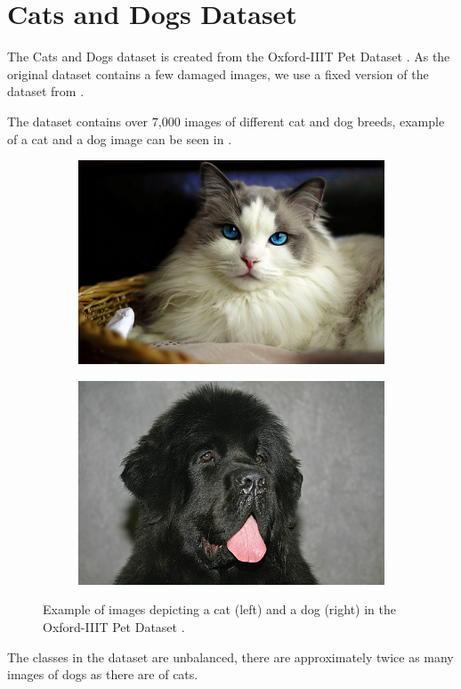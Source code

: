 \section{Cats and Dogs Dataset}\label{sec:cat_dog_dataset}
The Cats and Dogs dataset is created from the Oxford-IIIT Pet Dataset \cite{parkhi12a}. As the original dataset contains a few damaged images, we use a fixed version of the dataset from \cite{ml4py_dataset}.

The dataset contains over $7$,$000$ images of different cat and dog breeds, example of a cat and a dog image can be seen in .
\begin{figure}[!htp]
    \centering
    \begin{subfigure}[t]{0.45\textwidth}
        \includegraphics[width=\textwidth]{Figures/datasets/cat.jpg}
        \label{fig:original:example_cat}
    \end{subfigure}\hfill
    \begin{subfigure}[t]{0.45\textwidth}
        \includegraphics[width=\textwidth]{Figures/datasets/dog.jpg}
        \label{fig:original:example_dog}
    \end{subfigure}
    \caption[Example of images depicting a cat (left) and a dog (right) in the Oxford-IIIT Pet Dataset]{Example of images depicting a cat (left) and a dog (right) in the Oxford-IIIT Pet Dataset \cite{parkhi12a}.}
    \label{fig:iiit_pet}
\end{figure}
The classes in the dataset are unbalanced, there are approximately twice as many images of dogs as there are of cats.


